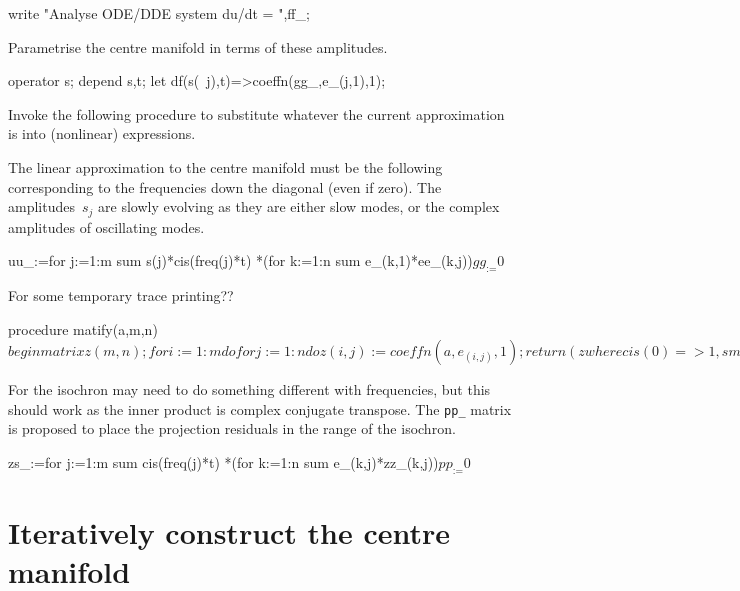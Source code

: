 \documentclass[11pt,a5paper]{article}
\begin{document}
\begin{reduce}
\end{reduce}

\begin{reduce}
write "Analyse ODE/DDE system du/dt = ",ff_;
\end{reduce}

Parametrise the centre manifold in terms of these amplitudes.

\begin{reduce}
operator s; depend s,t;
let df(s(~j),t)=>coeffn(gg_,e_(j,1),1);
\end{reduce}


Invoke the following procedure to substitute whatever the current approximation is into (nonlinear) expressions.



The linear approximation to the centre manifold must be the following corresponding to the frequencies down the diagonal (even if zero).
The amplitudes~$s_j$ are slowly evolving as they are either slow modes, or the complex amplitudes of oscillating modes.

\begin{reduce}
uu_:=for j:=1:m sum s(j)*cis(freq(j)*t)
  *(for k:=1:n sum e_(k,1)*ee_(k,j))$
gg_:=0$
\end{reduce}

For some temporary trace printing??
\begin{reduce}
procedure matify(a,m,n)$
  begin matrix z(m,n);
    for i:=1:m do for j:=1:n do z(i,j):=coeffn(a,e_(i,j),1);
    return (z where {cis(0)=>1,small=>s}); 
    end$
\end{reduce}

For the isochron may need to do something different with frequencies, but this should work as the inner product is complex conjugate transpose.
The \verb|pp_| matrix is proposed to place the projection residuals in the range of the isochron. 
\begin{reduce}
zs_:=for j:=1:m sum cis(freq(j)*t)
  *(for k:=1:n sum e_(k,j)*zz_(k,j))$
pp_:=0$
\end{reduce}




\section{Iteratively construct the centre manifold}
\end{document}
